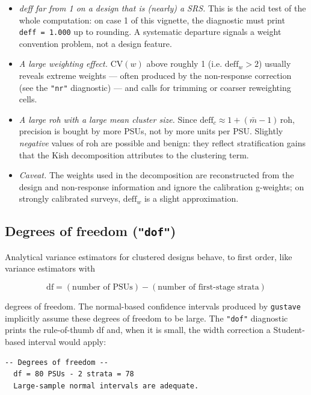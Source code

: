 \documentclass[
]{article}
\providecommand{\tightlist}{%
  \setlength{\itemsep}{0pt}\setlength{\parskip}{0pt}}
\begin{document}
\begin{itemize}
\tightlist
\item
  \emph{deff far from 1 on a design that is (nearly) a SRS.} This is the
  acid test of the whole computation: on case 1 of this vignette, the
  diagnostic must print \texttt{deff\ =\ 1.000} up to rounding. A
  systematic departure signals a weight convention problem, not a design
  feature.
\item
  \emph{A large weighting effect.} \(\mathrm{CV}(w)\) above roughly 1
  (i.e. \(\mathrm{deff}_w > 2\)) usually reveals extreme weights ---
  often produced by the non-response correction (see the \texttt{"nr"}
  diagnostic) --- and calls for trimming or coarser reweighting cells.
\item
  \emph{A large roh with a large mean cluster size.} Since
  \(\mathrm{deff}_c \approx 1 + (\bar m - 1)\,\mathrm{roh}\), precision
  is bought by more PSUs, not by more units per PSU. Slightly
  \emph{negative} values of roh are possible and benign: they reflect
  stratification gains that the Kish decomposition attributes to the
  clustering term.
\item
  \emph{Caveat.} The weights used in the decomposition are reconstructed
  from the design and non-response information and ignore the
  calibration g-weights; on strongly calibrated surveys,
  \(\mathrm{deff}_w\) is a slight approximation.
\end{itemize}

\subsection{\texorpdfstring{Degrees of freedom
(\texttt{"dof"})}{Degrees of freedom ("dof")}}\label{degrees-of-freedom-dof}

Analytical variance estimators for clustered designs behave, to first
order, like variance estimators with

\[\mathrm{df} = (\text{number of PSUs}) - (\text{number of first-stage strata})\]

degrees of freedom. The normal-based confidence intervals produced by
\texttt{gustave} implicitly assume these degrees of freedom to be large.
The \texttt{"dof"} diagnostic prints the rule-of-thumb df and, when it
is small, the width correction a Student-based interval would apply:

\begin{verbatim}
-- Degrees of freedom --
  df = 80 PSUs - 2 strata = 78
  Large-sample normal intervals are adequate.
\end{verbatim}
\end{document}
